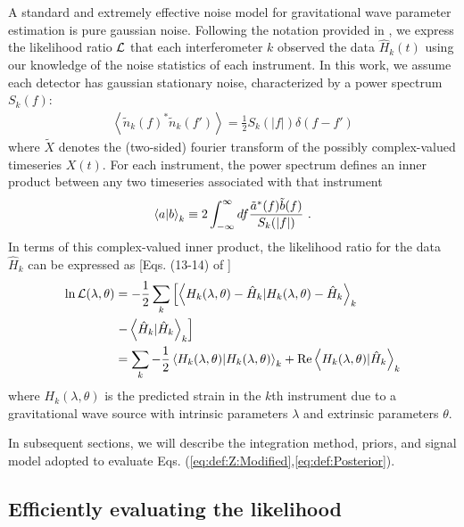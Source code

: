 A standard and extremely effective noise model for gravitational wave parameter estimation is pure gaussian noise.    Following the notation provided in
\cite{gwastro-mergers-HeeSuk-FisherMatrixWithAmplitudeCorrections,gwastro-mergers-HeeSuk-CompareToPE-Aligned}, we
express the likelihood ratio ${\cal L}$ that each interferometer $k$ observed the data $\hat{H}_k(t)$ using our knowledge
of the noise statistics of each instrument.   
%
In this work, we assume each detector has gaussian stationary noise, characterized by a power spectrum $S_k(f)$:
\begin{eqnarray}
\left<\tilde{n}_k(f)^* \tilde{n}_k(f')\right> = \frac{1}{2} S_k(|f|) \delta(f-f')
\end{eqnarray}
where  $\tilde{X}$ denotes the (two-sided) fourier transform of the possibly complex-valued timeseries $X(t)$.  
For each instrument, the power spectrum  defines an inner product between any two timeseries associated with that instrument
\begin{eqnarray} \label{eq:InnerProduct}
\left\langle a|b\right\rangle_k \equiv 2 \int_{-\infty}^{\infty} df \frac{\tilde{a}^*(f)\tilde{b}(f)}{S_k(|f|)}\ .
\end{eqnarray}
In terms of this complex-valued inner product, the likelihood ratio for the data $\hat{H}_k$ can be expressed as
[Eqs. (13-14) of \cite{gwastro-mergers-HeeSuk-CompareToPE-Aligned}]
\begin{align}
\ln {\cal L}(\lambda,\theta) &=
\nonumber -\frac{1}{2} \sum_k \left[ \left\langle H_k(\lambda,\theta)-\hat{H}_k|H_k(\lambda,\theta)-\hat{H}_k\right\rangle_k \right.
\nonumber \\ &  \left. - \left\langle\hat{H}_k|\hat{H}_k\right\rangle_k \right] \nonumber \\
\label{eq:def:LikelihoodRatio}
&=  \sum_k  -\frac{1}{2} \left\langle H_k(\lambda,\theta)|H_k(\lambda,\theta)\right\rangle_k +  \text{Re} \left\langle H_k(\lambda,\theta)|\hat{H}_k\right\rangle_k 
\end{align}
where $H_k(\lambda,\theta)$ is the predicted strain in the $k$th instrument due to a gravitational wave source with
intrinsic parameters $\lambda$ and extrinsic parameters $\theta$.  


In subsequent sections, we will describe the integration method, priors, and  signal model adopted to evaluate
Eqs. (\ref{eq:def:Z:Modified},\ref{eq:def:Posterior}).  

\subsection{Efficiently evaluating the likelihood}

